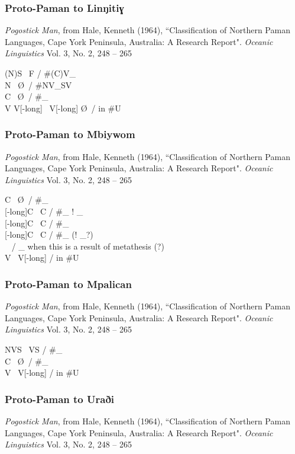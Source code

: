 \documentclass[11pt]{article}
\newcommand{\ipa}{\textipa}
\newcommand{\change}{\textrightarrow}
\begin{document}
\subsubsection{Proto-Paman to Linŋitiɣ}{\it Pogostick Man}, from Hale, Kenneth (1964), ``Classification of Northern Paman Languages, Cape York Peninsula, Australia: A Research Report". {\it Oceanic Linguistics} Vol. 3, No. 2, 248 -- 265

(N)S \change\ F / \#(C)V_\\
N \change\ \O\ / \#NV_SV\\
C \change\ \O\ / \#_\\
V\ipa{:} V[-long] \change\ V[-long] \O\ / in \#U

\subsubsection{Proto-Paman to Mbiywom}{\it Pogostick Man}, from Hale, Kenneth (1964), ``Classification of Northern Paman Languages, Cape York Peninsula, Australia: A Research Report". {\it Oceanic Linguistics} Vol. 3, No. 2, 248 -- 265

C \change\ \O\ / \#_\\
\ipa{i}[-long]C \change\ C\ipa{j} / \#_ ! _\ipa{i}\\
\ipa{u}[-long]C \change\ C\ipa{w} / \#_\\
\ipa{a}[-long]C \change\ C\ipa{a} / \#_ (! _\ipa{a}?)\\
\ipa{u i} \change\ \ipa{w j} / \ipa{a}_ when this \ipa{a} is a result of metathesis (?)\\
V\ipa{:} \change\ V[-long] / in \#U

\subsubsection{Proto-Paman to Mpalican}{\it Pogostick Man}, from Hale, Kenneth (1964), ``Classification of Northern Paman Languages, Cape York Peninsula, Australia: A Research Report". {\it Oceanic Linguistics} Vol. 3, No. 2, 248 -- 265

NVS \change\ V\ipa{\super n}S / \#_\\
C \change\ \O\ / \#_\\
V\ipa{:} \change\ V[-long] / in \#U

\subsubsection{Proto-Paman to Uraði}{\it Pogostick Man}, from Hale, Kenneth (1964), ``Classification of Northern Paman Languages, Cape York Peninsula, Australia: A Research Report". {\it Oceanic Linguistics} Vol. 3, No. 2, 248 -- 265
\end{document}

